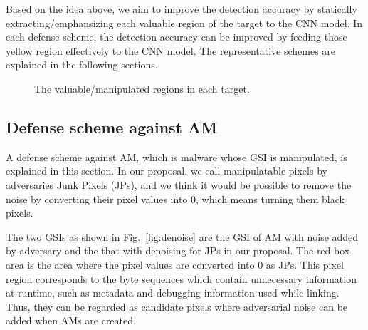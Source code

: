 \documentclass{ieeeaccess}
\newcommand{\myfigurename}{Fig.}
\begin{document}
Based on the idea above, we aim to improve the detection accuracy by statically extracting/emphansizing each valuable region of the target to the CNN model.
In each defense scheme, the detection accuracy can be improved by feeding those yellow region effectively to the CNN model.
The representative schemes are explained in the following sections.


\begin{figure}[t]
 \centering
 \caption{The valuable/manipulated regions in each target.} 
 \label{fig:prop}
\end{figure}

\subsection{Defense scheme against AM}
A defense scheme against AM, which is malware whose GSI is manipulated, is explained in this section.
In our proposal, we call manipulatable pixels by adversaries Junk Pixels (JPs), and we think it would be possible to remove the noise by converting their pixel values into 0, which means turning them black pixels.

The two GSIs as shown in \myfigurename~\ref{fig:denoise} are the GSI of AM with noise added by adversary and the that with denoising for JPs in our proposal.
The red box area is the area where the pixel values are converted into 0 as JPs.
This pixel region corresponds to the byte sequences which contain unnecessary information at runtime, such as metadata and debugging information used while linking.
Thus, they can be regarded as candidate pixels where adversarial noise can be added when AMs are created.
\end{document}
